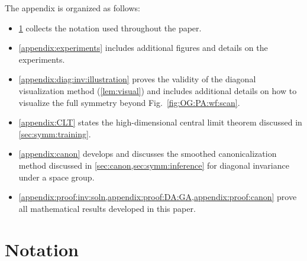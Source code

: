 
\noindent
The appendix is organized as follows:
\begin{itemize}[topsep=.5em, parsep=0em, partopsep=0em, itemsep=0.5em, leftmargin=1em]
    \item \cref{appendix:notation} collects the notation used throughout the paper.
    \item \cref{appendix:experiments} includes additional figures and details on the experiments.
    \item \cref{appendix:diag:inv:illustration} proves the validity of the diagonal visualization method (\cref{lem:visual}) and includes additional details on how to visualize the full symmetry beyond Fig.~\ref{fig:OG:PA:wf:scan}.
    \item \cref{appendix:CLT} states the high-dimensional central limit theorem discussed in \cref{sec:symm:training}.
    \item \cref{appendix:canon} develops and discusses the smoothed canonicalization method discussed in \cref{sec:canon,sec:symm:inference} for diagonal invariance under a space group.
    \item \cref{appendix:proof:inv:soln,appendix:proof:DA:GA,appendix:proof:canon} prove all mathematical results developed in this paper.
\end{itemize}



\section{Notation}  \label{appendix:notation}

